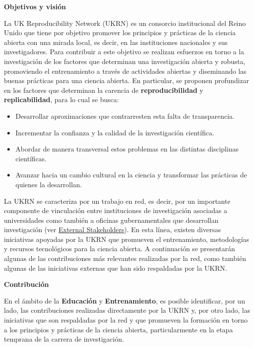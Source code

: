 \documentclass[
  spanish,
  a4paper,
  oneside]{scrbook}
\begin{document}
\textbf{Objetivos y visión}

La UK Reproducibility Network (UKRN) es un consorcio institucional del
Reino Unido que tiene por objetivo promover los principios y prácticas
de la ciencia abierta con una mirada local, es decir, en las
instituciones nacionales y sus investigadores. Para contribuir a este
objetivo se realizan esfuerzos en torno a la investigación de los
factores que determinan una investigación abierta y robusta, promoviendo
el entrenamiento a través de actividades abiertas y diseminando las
buenas prácticas para una ciencia abierta. En particular, se proponen
profundizar en los factores que determinan la carencia de
\textbf{reproducibilidad} y \textbf{replicabilidad}, para lo cual se
busca:

\begin{itemize}
\item
  Desarrollar aproximaciones que contrarresten esta falta de
  transparencia.
\item
  Incrementar la confianza y la calidad de la investigación científica.
\item
  Abordar de manera transversal estos problemas en las distintas
  disciplinas científicas.
\item
  Avanzar hacia un cambio cultural en la ciencia y transformar las
  prácticas de quienes la desarrollan.
\end{itemize}

La UKRN se caracteriza por un trabajo en red, es decir, por un
importante componente de vinculación entre instituciones de
investigación asociadas a universidades como también a oficinas
gubernamentales que desarrollan investigación (ver
\href{https://www.ukrn.org/stakeholders/}{External Stakeholders}). En
esta línea, existen diversas iniciativas apoyadas por la UKRN que
promueven el entrenamiento, metodologías y recursos tecnológicos para la
ciencia abierta. A continuación se presentarán algunas de las
contribuciones más relevantes realizadas por la red, como también
algunas de las iniciativas externas que han sido respaldadas por la
UKRN.

\textbf{Contribución}

En el ámbito de la \textbf{Educación} y \textbf{Entrenamiento}, es
posible identificar, por un lado, las contribuciones realizadas
directamente por la UKRN y, por otro lado, las iniciativas que son
respaldadas por la red y que promueven la formación en torno a los
principios y prácticas de la ciencia abierta, particularmente en la
etapa temprana de la carrera de investigación.
\end{document}
